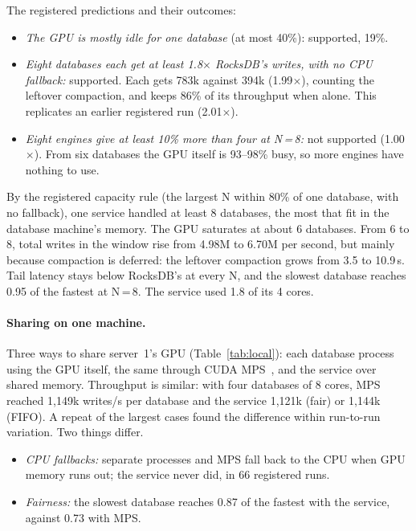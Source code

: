 \documentclass[sigconf, nonacm]{acmart}
\begin{document}
The registered predictions and their outcomes:
\begin{itemize}
  \item \emph{The GPU is mostly idle for one database} (at most 40\%): supported, 19\%.
  \item \emph{Eight databases each get at least 1.8$\times$ RocksDB's writes, with no CPU
        fallback:} supported. Each gets 783k against 394k (1.99$\times$), counting the
        leftover compaction, and keeps 86\% of its throughput when alone. This replicates an
        earlier registered run (2.01$\times$).
  \item \emph{Eight engines give at least 10\% more than four at N\,=\,8:} not supported
        (1.00$\times$). From six databases the GPU itself is 93--98\% busy, so more engines have
        nothing to use.
\end{itemize}

By the registered capacity rule (the largest N within 80\% of one database, with no
fallback), one service handled at least 8 databases, the most that fit in the database
machine's memory. The GPU saturates at about 6 databases. From 6 to 8, total writes in the
window rise from 4.98M to 6.70M per second, but mainly because compaction is deferred: the
leftover compaction grows from 3.5 to 10.9\,s. Tail latency stays below RocksDB's at every N,
and the slowest database reaches 0.95 of the fastest at N\,=\,8. The service used 1.8 of its 4
cores.

\paragraph{Sharing on one machine.} Three ways to share server~1's GPU (Table~\ref{tab:local}):
each database process using the GPU itself, the same through CUDA MPS~\cite{cudamps}, and the
service over shared memory. Throughput is similar: with four databases of 8 cores, MPS reached
1{,}149k writes/s per database and the service 1{,}121k (fair) or 1{,}144k (FIFO). A repeat
of the largest cases found the difference within run-to-run variation. Two things differ.
\begin{itemize}
  \item \emph{CPU fallbacks:} separate processes and MPS fall back to the CPU when GPU memory
        runs out; the service never did, in 66 registered runs.
  \item \emph{Fairness:} the slowest database reaches 0.87 of the fastest with the service,
        against 0.73 with MPS.
\end{itemize}
\end{document}
